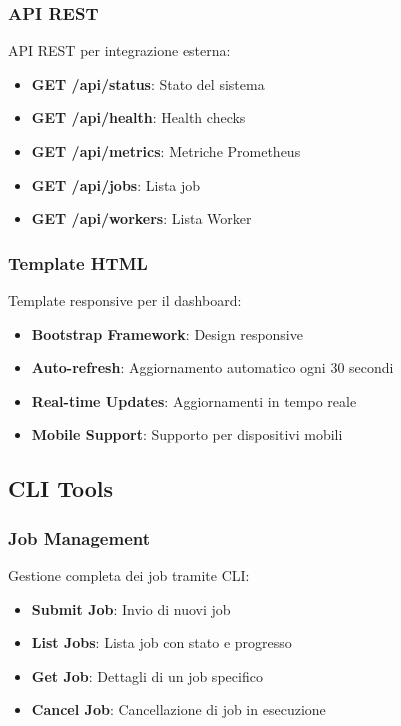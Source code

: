 \documentclass[12pt,a4paper]{article}
\begin{document}
\subsubsection{API REST}

API REST per integrazione esterna:

\begin{itemize}
\item \textbf{GET /api/status}: Stato del sistema
\item \textbf{GET /api/health}: Health checks
\item \textbf{GET /api/metrics}: Metriche Prometheus
\item \textbf{GET /api/jobs}: Lista job
\item \textbf{GET /api/workers}: Lista Worker
\end{itemize}

\subsubsection{Template HTML}

Template responsive per il dashboard:

\begin{itemize}
\item \textbf{Bootstrap Framework}: Design responsive
\item \textbf{Auto-refresh}: Aggiornamento automatico ogni 30 secondi
\item \textbf{Real-time Updates}: Aggiornamenti in tempo reale
\item \textbf{Mobile Support}: Supporto per dispositivi mobili
\end{itemize}

\subsection{CLI Tools}

\subsubsection{Job Management}

Gestione completa dei job tramite CLI:

\begin{itemize}
\item \textbf{Submit Job}: Invio di nuovi job
\item \textbf{List Jobs}: Lista job con stato e progresso
\item \textbf{Get Job}: Dettagli di un job specifico
\item \textbf{Cancel Job}: Cancellazione di job in esecuzione
\end{itemize}
\end{document}

